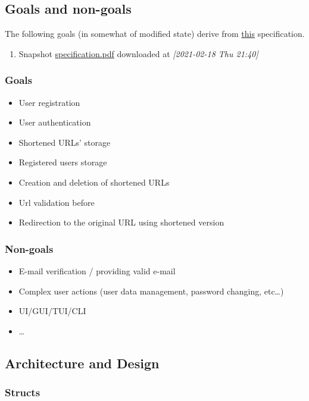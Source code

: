 \documentclass[11pt]{article}
\begin{document}
\subsection{Goals and non-goals}
\label{sec:org5c0ef54}
The following goals (in somewhat of modified state)
derive from \href{https:https://docs.google.com/document/d/1RIQWpiXRuxUmI\_VhMZjo-UgxMxjEIXIpC2tmMY\_ZpuE}{this} specification.
\begin{enumerate}
\item Snapshot
\label{sec:org95cd483}
\href{specification\_foreign\_2021\_02\_18\_21\_40\_37.pdf}{specification.pdf} downloaded at \textit{[2021-02-18 Thu 21:40]}
\end{enumerate}


\subsubsection{Goals}
\label{sec:orgd4bb57f}
\begin{itemize}
\item User registration
\item User authentication
\item Shortened URLs'  storage
\item Registered users storage
\item Creation and deletion of shortened URLs
\item Url validation before
\item Redirection to the original URL using shortened version
\end{itemize}
\subsubsection{Non-goals}
\label{sec:orgf455ab5}
\begin{itemize}
\item E-mail verification / providing valid e-mail
\item Complex user actions (user data management, password changing, etc\ldots{})
\item UI/GUI/TUI/CLI
\item \ldots{}
\end{itemize}

\subsection{Architecture and Design}
\label{sec:org980e9e8}

\subsubsection{Structs}
\label{sec:org801a30a}
\label{sec:structs}
\end{document}
